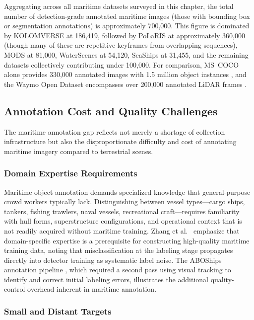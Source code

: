 Aggregating across all maritime datasets surveyed in this chapter, the total number of
detection-grade annotated maritime images (those with bounding box or segmentation
annotations) is approximately 700,000. This figure is dominated by KOLOMVERSE at
186,419, followed by PoLaRIS at approximately 360,000 (though many of these are
repetitive keyframes from overlapping sequences), MODS at 81,000, WaterScenes at
54,120, SeaShips at 31,455, and the remaining datasets collectively contributing
under 100,000. For comparison, MS~COCO alone provides 330,000 annotated images with
1.5 million object instances \cite{Lin2014COCO}, and the Waymo Open Dataset
encompasses over 200,000 annotated LiDAR frames \cite{Sun2020Waymo}.

\subsection{Annotation Cost and Quality Challenges}
\label{subsec:annotation_challenges}

The maritime annotation gap reflects not merely a shortage of collection infrastructure
but also the disproportionate difficulty and cost of annotating maritime imagery compared
to terrestrial scenes.

\subsubsection{Domain Expertise Requirements}

Maritime object annotation demands specialized knowledge that general-purpose crowd
workers typically lack. Distinguishing between vessel types---cargo ships, tankers,
fishing trawlers, naval vessels, recreational craft---requires familiarity with hull
forms, superstructure configurations, and operational context that is not readily
acquired without maritime training. Zhang et al.~\cite{Zhang2021MarineDetectionSurvey}
emphasize that domain-specific expertise is a prerequisite for constructing
high-quality maritime training data, noting that misclassification at the labeling
stage propagates directly into detector training as systematic label noise. The ABOShips
annotation pipeline \cite{Iancu2021ABOShips}, which required a second pass using visual
tracking to identify and correct initial labeling errors, illustrates the additional
quality-control overhead inherent in maritime annotation.

\subsubsection{Small and Distant Targets}

